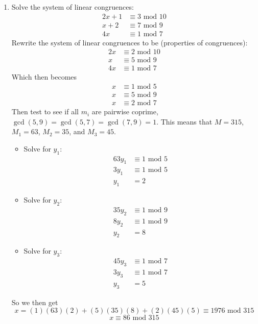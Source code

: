 \documentclass[class=article, crop=false]{standalone}
\begin{document}
\begin{enumerate}
\item
  Solve the system of linear congruences:
  \begin{align*}
	2x+1 & \equiv 3\mbox{ mod } 10 \\
	x+2 & \equiv 7\mbox{ mod } 9 \\
	4x & \equiv 1\mbox{ mod } 7
  \end{align*}
  Rewrite the system of linear congruences to be (properties of congruences):
  \begin{align*}
	2x &\equiv 2\mbox{ mod } 10 \\
	x &\equiv 5\mbox{ mod } 9 \\
	4x &\equiv 1\mbox{ mod } 7
  \end{align*}
  Which then becomes
  \begin{align*}
	x &\equiv 1\mbox{ mod } 5 \\
	x &\equiv 5\mbox{ mod } 9 \\
	x &\equiv 2\mbox{ mod } 7
  \end{align*}
  Then test to see if all $m_i$ are pairwise coprime, 
  $\gcd(5,9)=\gcd(5,7)=\gcd(7,9)=1$. This means that
  $M=315$, $M_1=63$, $M_2=35$, and $M_3=45$.
  \begin{itemize}
	\item[] Solve for $y_1$:
	  \begin{align*}
		63y_1 &\equiv 1\mbox{ mod }5 \\
		3y_1 &\equiv 1\mbox{ mod }5 \\
		y_1 &= 2
	  \end{align*}
	\item[] Solve for $y_2$:
	  \begin{align*}
		35y_2 &\equiv 1\mbox{ mod }9 \\
		8y_2 &\equiv 1\mbox{ mod }9 \\
		y_2 &= 8
	  \end{align*}
	\item[] Solve for $y_3$: 
	  \begin{align*}
		45y_3 &\equiv 1\mbox{ mod }7 \\
		3y_3 &\equiv 1\mbox{ mod }7 \\
		y_3 &=5
	  \end{align*}
  \end{itemize}
  So we then get
  $$x=(1)(63)(2) + (5)(35)(8) + (2)(45)(5) \equiv 1976 \mbox{ mod } 315$$
  $$x\equiv 86\mbox{ mod }315$$

\end{enumerate}


\setcounter{subsection}{5}
\end{document}
